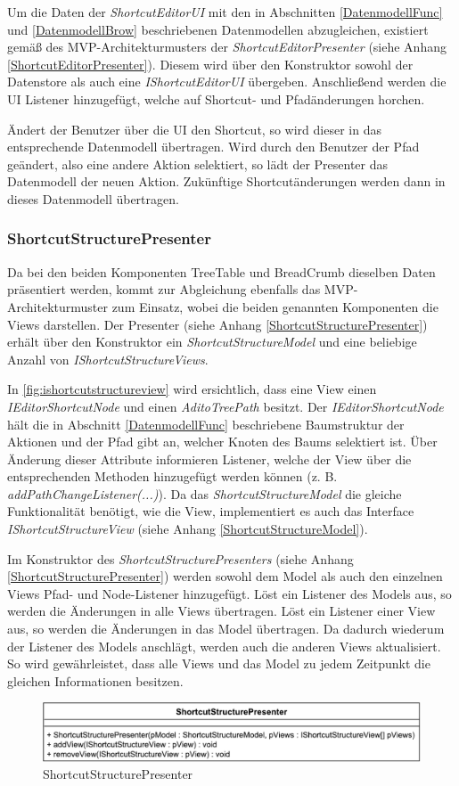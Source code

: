 Um die Daten der \emph{ShortcutEditorUI} mit den in Abschnitten \ref{DatenmodellFunc} und \ref{DatenmodellBrow} beschriebenen Datenmodellen abzugleichen, existiert gemäß des MVP-Architekturmusters der \emph{ShortcutEditorPresenter} (siehe Anhang \ref{ShortcutEditorPresenter}). Diesem wird über den Konstruktor sowohl der Datenstore als auch eine \emph{IShortcutEditorUI} übergeben. Anschließend werden die UI Listener hinzugefügt, welche auf Shortcut- und Pfadänderungen horchen.

Ändert der Benutzer über die UI den Shortcut, so wird dieser in das entsprechende Datenmodell übertragen. Wird durch den Benutzer der Pfad geändert, also eine andere Aktion selektiert, so lädt der Presenter das Datenmodell der neuen Aktion. Zukünftige Shortcutänderungen werden dann in dieses Datenmodell übertragen.

\subsubsection{ShortcutStructurePresenter}

Da bei den beiden Komponenten TreeTable und BreadCrumb dieselben Daten präsentiert werden, kommt zur Abgleichung ebenfalls das MVP-Architekturmuster zum Einsatz, wobei die beiden genannten Komponenten die Views darstellen. Der Presenter (siehe Anhang \ref{ShortcutStructurePresenter}) erhält über den Konstruktor ein \emph{ShortcutStructureModel} und eine beliebige Anzahl von \emph{IShortcutStructureViews}. 

In \autoref{fig:ishortcutstructureview} wird ersichtlich, dass eine View einen \emph{IEditorShortcutNode} und einen \emph{AditoTreePath} besitzt. Der \emph{IEditorShortcutNode} hält die in Abschnitt \ref{DatenmodellFunc} beschriebene Baumstruktur der Aktionen und der Pfad gibt an, welcher Knoten des Baums selektiert ist. Über Änderung dieser Attribute informieren Listener, welche der View über die entsprechenden Methoden hinzugefügt werden können (z. B. \emph{addPathChangeListener(...)}). Da das \emph{ShortcutStructureModel} die gleiche Funktionalität benötigt, wie die View, implementiert es auch das Interface \emph{IShortcutStructureView} (siehe Anhang \ref{ShortcutStructureModel}).

Im Konstruktor des \emph{ShortcutStructurePresenters} (siehe Anhang \ref{ShortcutStructurePresenter}) werden sowohl dem Model als auch den einzelnen Views Pfad- und Node-Listener hinzugefügt. Löst ein Listener des Models aus, so werden die Änderungen in alle Views übertragen. Löst ein Listener einer View aus, so werden die Änderungen in das Model übertragen. Da dadurch wiederum der Listener des Models anschlägt, werden auch die anderen Views aktualisiert. So wird gewährleistet, dass alle Views und das Model zu jedem Zeitpunkt die gleichen Informationen besitzen.

\begin{figure}[H]
	\centering
	\includegraphics[width=0.6\linewidth]{../graphic/diagrams/CD_ShortcutStructurePresenter/ShortcutStructurePresenter}
	\caption{ShortcutStructurePresenter}
	\label{fig:shortcutstructurepresenter}
\end{figure}

\newpage